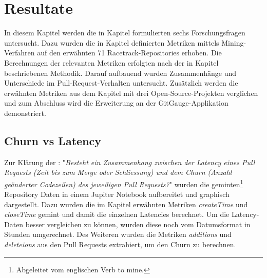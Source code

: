 


\chapter{Resultate} %

\label{Chapter4} %

In diesem Kapitel werden die in Kapitel  formulierten sechs Forschungsfragen untersucht. Dazu wurden die in Kapitel  definierten Metriken mittels Mining-Verfahren auf den erwähnten 71 Racetrack-Repositories erhoben. Die Berechnungen der relevanten Metriken erfolgten nach der in Kapitel  beschriebenen Methodik. Darauf aufbauend wurden Zusammenhänge und Unterschiede im Pull-Request-Verhalten untersucht. Zusätzlich werden die erwähnten Metriken aus dem Kapitel  mit drei Open-Source-Projekten verglichen und zum Abschluss wird die Erweiterung an der GitGauge-Applikation demonstriert. 


\section{Churn vs Latency}
\label{sec:ResultatChurnLatency}
Zur Klärung der : "\textit{Besteht ein Zusammenhang zwischen der Latency eines Pull
Requests (Zeit bis zum Merge oder Schliessung) und dem Churn (Anzahl geänderter Codezeilen) des jeweiligen Pull Requests?}" wurden die geminten\footnote{Abgeleitet vom englischen Verb to mine.} Repository Daten in einem Jupiter Notebook aufbereitet und graphisch dargestellt. Dazu wurden die im Kapitel  erwähnten Metriken \textit{createTime} und \textit{closeTime} gemint und damit die einzelnen Latencies berechnet. Um die Latency-Daten besser vergleichen zu können, wurden diese noch vom Datumsformat in Stunden umgerechnet. Des Weiteren wurden die Metriken  \textit{additions} und  \textit{deleteions} aus den Pull Requests extrahiert, um den Churn zu berechnen.

